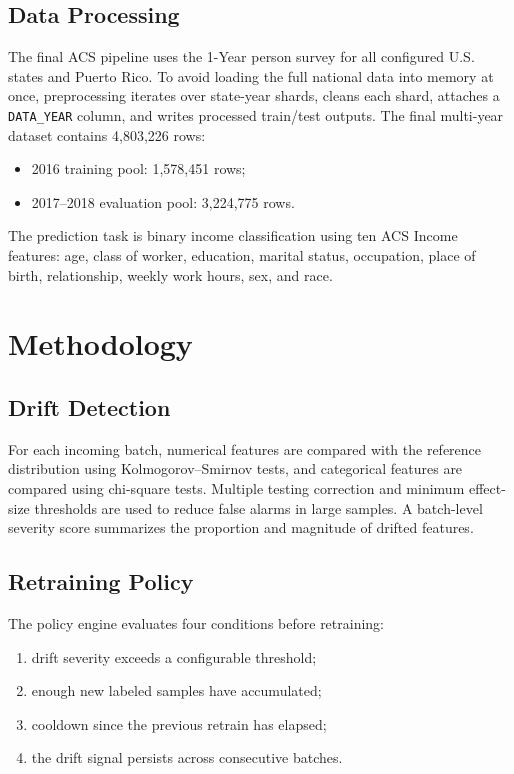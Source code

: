 \documentclass[conference]{IEEEtran}
\begin{document}
\subsection{Data Processing}
The final ACS pipeline uses the 1-Year person survey for all configured U.S. states and Puerto Rico. To avoid loading the full national data into memory at once, preprocessing iterates over state-year shards, cleans each shard, attaches a \texttt{DATA\_YEAR} column, and writes processed train/test outputs. The final multi-year dataset contains 4{,}803{,}226 rows:
\begin{itemize}[leftmargin=*]
    \item 2016 training pool: 1{,}578{,}451 rows;
    \item 2017--2018 evaluation pool: 3{,}224{,}775 rows.
\end{itemize}

The prediction task is binary income classification using ten ACS Income features: age, class of worker, education, marital status, occupation, place of birth, relationship, weekly work hours, sex, and race.

\section{Methodology}
\subsection{Drift Detection}
For each incoming batch, numerical features are compared with the reference distribution using Kolmogorov--Smirnov tests, and categorical features are compared using chi-square tests. Multiple testing correction and minimum effect-size thresholds are used to reduce false alarms in large samples. A batch-level severity score summarizes the proportion and magnitude of drifted features.

\subsection{Retraining Policy}
The policy engine evaluates four conditions before retraining:
\begin{enumerate}[leftmargin=*]
    \item drift severity exceeds a configurable threshold;
    \item enough new labeled samples have accumulated;
    \item cooldown since the previous retrain has elapsed;
    \item the drift signal persists across consecutive batches.
\end{enumerate}
\end{document}
